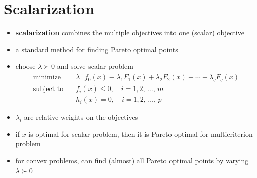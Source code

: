 \documentclass[11pt]{extarticle}
\theoremstyle{definition}
\begin{document}
\newpage

%
%

\section*{Scalarization}

\begin{itemize}
  \item {\bf scalarization} combines the multiple objectives into one (scalar) objective
  \item a standard method for finding Pareto optimal points
  \item choose $\lambda\succ 0$ and solve scalar problem
    \begin{align*}
      \text{minimize}\quad &\lambda^\top f_0(x) \equiv \lambda_1 F_1(x) + \lambda_2 F_2(x) + \cdots + \lambda_q F_q(x) \\
      \text{subject to}\quad & f_i(x)\leqslant 0,\quad i = 1, 2,\,\ldots,\,m \\
      \qquad\qquad & h_i(x) = 0,\quad i = 1, 2,\,\ldots,\,p
    \end{align*}
  \item $\lambda_i$ are relative weights on the objectives
  \item if $x$ is optimal for scalar problem, then it is Pareto-optimal for multicriterion problem
  \item for convex problems, can find (almost) all Pareto optimal points by varying $\lambda\succ 0$
\end{itemize}

\newpage
\end{document}
